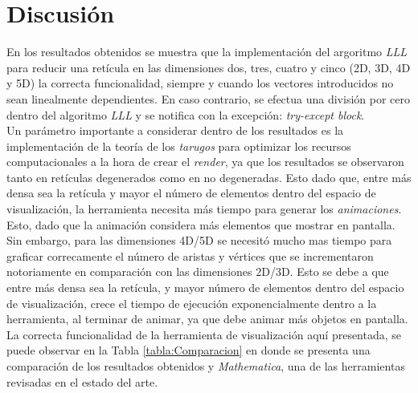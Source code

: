 \documentclass{llncs}
\begin{document}
\section{Discusi\'on}
\label{Discusión}
    En los resultados obtenidos se muestra que la implementaci\'on del argoritmo \textit{LLL} para reducir una ret\'icula en las dimensiones dos, tres, cuatro y cinco (2D, 3D, 4D y 5D) la correcta funcionalidad, siempre y cuando los vectores introducidos no sean linealmente dependientes. En caso contrario, se efectua una divisi\'on por cero dentro del algoritmo \textit{LLL} y se notifica con la excepción: \textit{try-except block}.\\
Un parámetro importante a considerar dentro de los resultados es la implementaci\'on de la teor\'ia de los \textit{tarugos} para optimizar los recursos computacionales a la hora de crear el \textit{render}, ya que los resultados se observaron tanto en ret\'iculas degenerados como en no degeneradas. Esto dado que, entre m\'as densa sea la ret\'icula y mayor el n\'umero de elementos dentro del espacio de visualizaci\'on, la herramienta necesita m\'as tiempo para generar los \textit{animaciones}. Esto, dado que la animaci\'on considera m\'as elementos que mostrar en pantalla. Sin embargo, para las dimensiones 4D/5D se necesitó mucho mas tiempo para graficar correcamente el n\'umero de aristas y v\'ertices que se incrementaron notoriamente en comparación con las dimensiones 2D/3D. Esto se debe a que entre m\'as densa sea la ret\'icula, y mayor n\'umero de elementos dentro del espacio de visualizaci\'on, crece el tiempo de ejecución exponencialmente dentro a la herramienta, al terminar de animar, ya que debe animar m\'as objetos en pantalla. 
La correcta funcionalidad de la herramienta de visualización aquí presentada, se puede observar en la Tabla \ref{tabla:Comparacion} en donde se presenta una comparación de los resultados obtenidos y \textit{Mathematica}, una de las herramientas revisadas en el estado del arte. 
\end{document}
